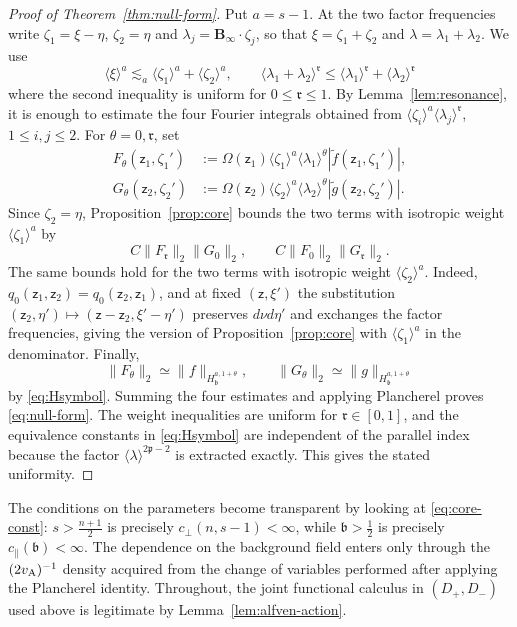 \documentclass[11pt,reqno]{amsart}
\theoremstyle{plain}
\theoremstyle{definition}
\theoremstyle{remark}
\numberwithin{equation}{section}
\newcommand{\breg}{\mathfrak b}
\newcommand{\preg}{\mathfrak p}
\newcommand{\rpar}{\mathfrak r}
\newcommand{\Binf}{\mathbf B_\infty}
\begin{document}
\begin{proof}[Proof of Theorem~\ref{thm:null-form}]
Put $a=s-1$.  At the two factor frequencies write
$\zeta_1=\xi-\eta$, $\zeta_2=\eta$ and
$\lambda_j=\Binf\cdot\zeta_j$, so that
$\xi=\zeta_1+\zeta_2$ and $\lambda=\lambda_1+\lambda_2$.
We use
\[
 \langle\xi\rangle^a
 \lesssim_a\langle\zeta_1\rangle^a+\langle\zeta_2\rangle^a,
 \qquad
 \langle\lambda_1+\lambda_2\rangle^{\rpar}
 \le\langle\lambda_1\rangle^{\rpar}
    +\langle\lambda_2\rangle^{\rpar}
\]
where the second inequality is uniform for $0\le\rpar\le1$. By
Lemma~\ref{lem:resonance}, it is enough to estimate the four Fourier integrals
obtained from
$\langle\zeta_i\rangle^a\langle\lambda_j\rangle^{\rpar}$,
$1\le i,j\le2$. For $\theta=0,\rpar$, set
\begin{align*}
 F_\theta(\mathsf z_1,\zeta_1')
 &:=\Omega(\mathsf z_1)\langle\zeta_1\rangle^a
    \langle\lambda_1\rangle^\theta
    |\widetilde f(\mathsf z_1,\zeta_1')|,
 \\
 G_\theta(\mathsf z_2,\zeta_2')
 &:=\Omega(\mathsf z_2)\langle\zeta_2\rangle^a
    \langle\lambda_2\rangle^\theta
    |\widetilde g(\mathsf z_2,\zeta_2')|.
\end{align*}
Since $\zeta_2=\eta$, Proposition~\ref{prop:core} bounds the two terms with
isotropic weight $\langle\zeta_1\rangle^a$ by
\[
 C\|F_{\rpar}\|_2\|G_0\|_2,
 \qquad
 C\|F_0\|_2\|G_{\rpar}\|_2.
\]
The same bounds hold for the two terms with isotropic weight
$\langle\zeta_2\rangle^a$. Indeed,
$q_0(\mathsf z_1,\mathsf z_2)=q_0(\mathsf z_2,\mathsf z_1)$, and at fixed
$(\mathsf z,\xi')$ the
substitution $(\mathsf z_2,\eta')\mapsto(\mathsf z-\mathsf z_2,\xi'-\eta')$
preserves $d\nu d\eta'$ and exchanges the factor frequencies, giving the
version of Proposition~\ref{prop:core} with
$\langle\zeta_1\rangle^a$ in the denominator. Finally,
\[
 \|F_\theta\|_2\simeq\|f\|_{H^{a,1+\theta}_{\breg}},
 \qquad
 \|G_\theta\|_2\simeq\|g\|_{H^{a,1+\theta}_{\breg}}
\]
by \eqref{eq:Hsymbol}. Summing the four estimates and applying Plancherel proves
\eqref{eq:null-form}. The weight inequalities are uniform for
$\rpar\in[0,1]$, and the equivalence constants in \eqref{eq:Hsymbol} are
independent of the parallel index because the factor
$\langle\lambda\rangle^{2\preg-2}$ is extracted exactly. This gives the stated
uniformity.
\end{proof}

The conditions on the parameters become transparent by looking at \eqref{eq:core-const}:
$s>\frac{n+1}2$ is precisely $c_\perp(n,s-1)<\infty$, while
$\breg>\frac12$ is precisely $c_\parallel(\breg)<\infty$.
The dependence on the background field enters only through the $(2v_{\rm A})^{-1}$ density acquired from the change of variables performed after applying the Plancherel identity.  Throughout, the joint functional calculus in $(D_+,D_-)$ used above is legitimate by Lemma~\ref{lem:alfven-action}.
\end{document}
